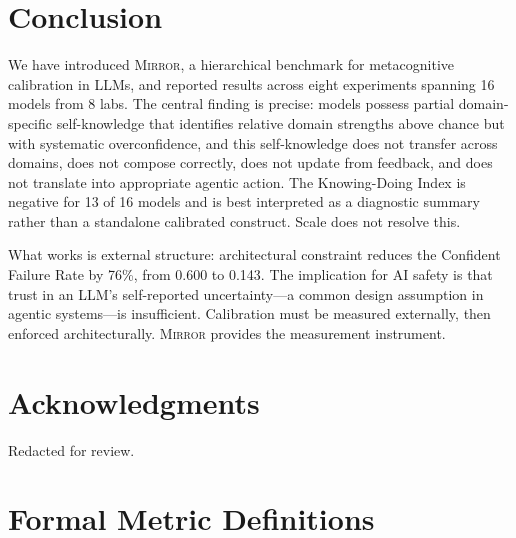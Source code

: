 \documentclass[10pt]{article}
\newcommand{\mirror}{\textsc{Mirror}}
\begin{document}
\vspace{-1mm}
\section{Conclusion}
\label{sec:conclusion}

We have introduced \mirror{}, a hierarchical benchmark for metacognitive
calibration in LLMs, and reported results across eight experiments spanning 16
models from 8 labs. The central finding is precise: models possess partial domain-specific
self-knowledge that identifies relative domain strengths above chance but with
systematic overconfidence, and this self-knowledge
does not transfer across domains, does not compose correctly, does not update from
feedback, and does not translate into appropriate agentic action. The Knowing-Doing
Index is negative for 13 of 16 models and is best interpreted as a diagnostic summary rather than a standalone calibrated construct. Scale does not resolve this.

What works is external structure: architectural constraint reduces the Confident
Failure Rate by 76\%, from 0.600 to 0.143. The implication for AI safety is that
trust in an LLM's self-reported uncertainty---a common design assumption in agentic
systems---is insufficient. Calibration must be measured externally, then enforced
architecturally. \mirror{} provides the measurement instrument.

\section*{Acknowledgments}

Redacted for review.

\FloatBarrier




\newpage
\appendix

\section{Formal Metric Definitions}
\label{app:metrics}
\end{document}
